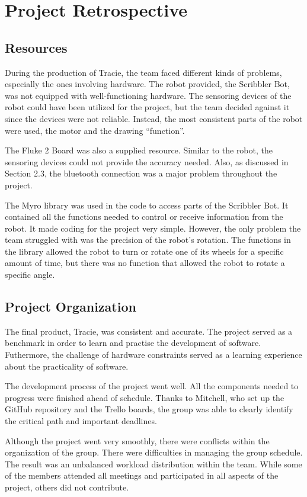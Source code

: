 \documentclass[11pt, letterpaper]{article}
\begin{document}
	\section{Project Retrospective}
	
		\subsection{Resources}
			During the production of Tracie, the team faced different kinds of problems, especially the ones involving hardware. The robot provided, the Scribbler Bot, was not equipped with well-functioning hardware. The sensoring devices of the robot could have been utilized for the project, but the team decided against it since the devices were not reliable. Instead, the most consistent parts of the robot were used, the motor and the drawing “function”.
			\par
			The Fluke 2 Board was also a supplied resource. Similar to the robot, the sensoring devices could not provide the accuracy needed. Also, as discussed in Section 2.3, the bluetooth connection was a major problem throughout the project.
			\par
			The Myro library was used in the code to access parts of the Scribbler Bot. It contained all the functions needed to control or receive information from the robot. It made coding for the project very simple. However, the only problem the team struggled with was the precision of the robot's rotation. The functions in the library allowed the robot to turn or rotate one of its wheels for a specific amount of time, but there was no function that allowed the robot to rotate a specific angle.
			\par

		\subsection{Project Organization}
			The final product, Tracie, was consistent and accurate. The project served as a benchmark in order to learn and practise the development of software. Futhermore, the challenge of hardware constraints served as a learning experience about the practicality of software.
			\par
			The development process of the project went well. All the components needed to progress were finished ahead of schedule. Thanks to Mitchell, who set up the GitHub repository and the Trello boards, the group was able to clearly identify the critical path and important deadlines.
			\par
			Although the project went very smoothly, there were conflicts within the organization of the group. There were difficulties in managing the group schedule. The result was an unbalanced workload distribution within the team. While some of the members attended all meetings and participated in all aspects of the project, others did not contribute.
			\par
\end{document}
